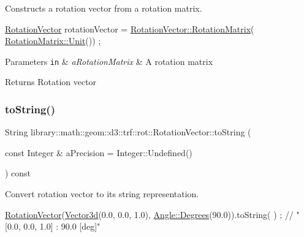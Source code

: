 Constructs a rotation vector from a rotation matrix. 


\begin{DoxyCode}
\hyperlink{classlibrary_1_1math_1_1geom_1_1d3_1_1trf_1_1rot_1_1_rotation_vector_a49076a279f457fdb14c4a9d4d61e1738}{RotationVector} rotationVector = \hyperlink{classlibrary_1_1math_1_1geom_1_1d3_1_1trf_1_1rot_1_1_rotation_vector_a397807ffe12bb72cd788660b83bdf7b3}{RotationVector::RotationMatrix}(
      \hyperlink{classlibrary_1_1math_1_1geom_1_1d3_1_1trf_1_1rot_1_1_rotation_matrix_aeb5324151ee55348fa16c5fe78b036ed}{RotationMatrix::Unit}()) ;
\end{DoxyCode}



\begin{DoxyParams}[1]{Parameters}
\mbox{\tt in}  & {\em a\+Rotation\+Matrix} & A rotation matrix \\
\hline
\end{DoxyParams}
\begin{DoxyReturn}{Returns}
Rotation vector 
\end{DoxyReturn}
\mbox{\label{classlibrary_1_1math_1_1geom_1_1d3_1_1trf_1_1rot_1_1_rotation_vector_a33b2f1e9a3fb983dccd3bfc3c7c33327}} 
\subsubsection{\texorpdfstring{to\+String()}{toString()}}
{\footnotesize\ttfamily String library\+::math\+::geom\+::d3\+::trf\+::rot\+::\+Rotation\+Vector\+::to\+String (\begin{DoxyParamCaption}\item[{const Integer \&}]{a\+Precision = {\ttfamily Integer\+:\+:Undefined()} }\end{DoxyParamCaption}) const}



Convert rotation vector to its string representation. 


\begin{DoxyCode}
\hyperlink{classlibrary_1_1math_1_1geom_1_1d3_1_1trf_1_1rot_1_1_rotation_vector_a49076a279f457fdb14c4a9d4d61e1738}{RotationVector}(\hyperlink{namespacelibrary_1_1math_1_1obj_a977e84e9bf317a4e7dd9d6d671d6da2f}{Vector3d}(0.0, 0.0, 1.0), \hyperlink{classlibrary_1_1math_1_1geom_1_1_angle_a64aa53e8420aeb6f671d86c65c370bc8}{Angle::Degrees}(90.0)).toString(
      ) ; \textcolor{comment}{// "[0.0, 0.0, 1.0] : 90.0 [deg]"}
\end{DoxyCode}



